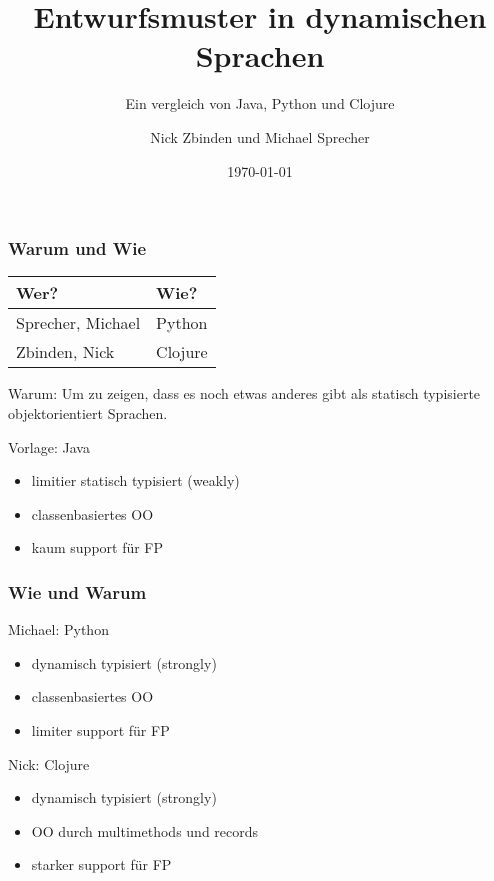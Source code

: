 \documentclass[compress, blue]{beamer}
\title{Entwurfsmuster in dynamischen Sprachen}
\subtitle{Ein vergleich von Java, Python und Clojure}
\author{Nick Zbinden und Michael Sprecher}
\date{\today}
\begin{document}
\begin{frame}
  \titlepage
\end{frame}

\begin{frame}\frametitle{Warum und Wie}

\begin{center}
\begin{tabular}{l  l}
  Wer? & Wie?\\
  \hline
  Sprecher, Michael & Python\\
  Zbinden, Nick & Clojure\\
\end{tabular}
\end{center}
\vspace{0.2cm}

\begin{block}{Warum:}
  Um zu zeigen, dass es noch etwas anderes gibt als statisch
  typisierte objektorientiert Sprachen.
\end{block}

\begin{block}{Vorlage: Java}
  \begin{itemize}
    \item limitier statisch typisiert (weakly)
    \item classenbasiertes OO
    \item kaum support für FP
  \end{itemize}
\end{block}

\end{frame}

\begin{frame}\frametitle{Wie und Warum}

\begin{block}{Michael: Python}
  \begin{itemize}
    \item dynamisch typisiert (strongly)
    \item classenbasiertes OO
    \item limiter support für FP
  \end{itemize}
\end{block} 

\begin{block}{Nick: Clojure}
  \begin{itemize}
    \item dynamisch typisiert (strongly)
    \item OO durch multimethods und records
    \item starker support für FP
  \end{itemize}
\end{block}
\end{frame}
\end{document}
